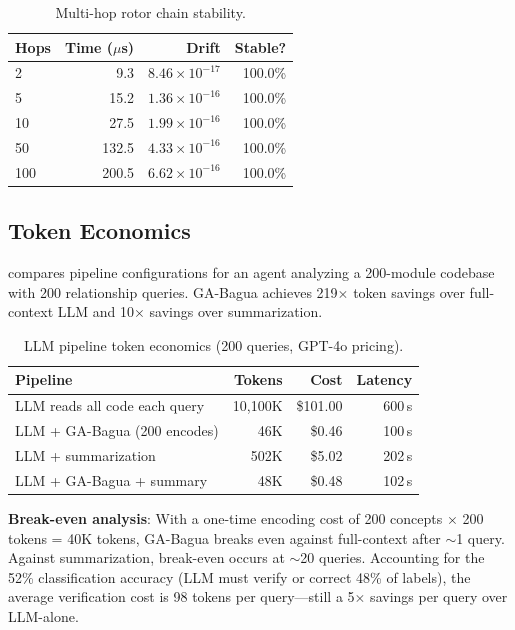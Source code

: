 \documentclass[11pt,a4paper]{article}
\begin{document}
\begin{table}[ht]
\centering
\caption{Multi-hop rotor chain stability.}
\label{tab:multihop}
\begin{tabular}{lrrr}
\toprule
\textbf{Hops} & \textbf{Time ($\mu$s)} & \textbf{Drift} & \textbf{Stable?} \\
\midrule
   2  &   9.3  & $8.46\!\times\!10^{-17}$ & 100.0\% \\
   5  &  15.2  & $1.36\!\times\!10^{-16}$ & 100.0\% \\
  10  &  27.5  & $1.99\!\times\!10^{-16}$ & 100.0\% \\
  50  & 132.5  & $4.33\!\times\!10^{-16}$ & 100.0\% \\
 100  & 200.5  & $6.62\!\times\!10^{-16}$ & 100.0\% \\
\bottomrule
\end{tabular}
\end{table}

\subsection{Token Economics}

 compares pipeline configurations for an agent analyzing a
200-module codebase with 200 relationship queries. GA-Bagua achieves
219$\times$ token savings over full-context LLM and 10$\times$ savings over
summarization.

\begin{table}[ht]
\centering
\caption{LLM pipeline token economics (200 queries, GPT-4o pricing).}
\label{tab:tokens}
\begin{tabular}{lrrr}
\toprule
\textbf{Pipeline} & \textbf{Tokens} & \textbf{Cost} & \textbf{Latency} \\
\midrule
LLM reads all code each query  & 10,100K & \$101.00 & 600\,s \\
LLM + GA-Bagua (200 encodes)   &    46K  &   \$0.46 & 100\,s \\
LLM + summarization            &   502K  &   \$5.02 & 202\,s \\
LLM + GA-Bagua + summary       &    48K  &   \$0.48 & 102\,s \\
\bottomrule
\end{tabular}
\end{table}

\textbf{Break-even analysis}: With a one-time encoding cost of 200 concepts
$\times$ 200 tokens = 40K tokens, GA-Bagua breaks even against full-context
after $\sim$1 query. Against summarization, break-even occurs at $\sim$20
queries. Accounting for the 52\% classification accuracy (LLM must verify or
correct 48\% of labels), the average verification cost is 98 tokens per
query---still a 5$\times$ savings per query over LLM-alone.
\end{document}
